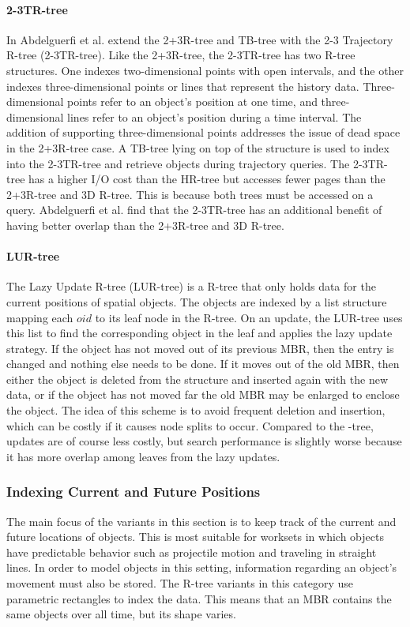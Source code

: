 \paragraph{2-3TR-tree} In \cite{abdelguerfi20022} Abdelguerfi et al. extend 
the 2+3R-tree and TB-tree with the 2-3 Trajectory R-tree (2-3TR-tree). 
Like the 2+3R-tree, the 2-3TR-tree has two R-tree structures. One indexes
two-dimensional points with open intervals, and the other indexes 
three-dimensional points or lines that represent the history data. 
Three-dimensional points refer to an object's position at one time, and 
three-dimensional lines refer to an object's position during a time 
interval. The addition of supporting three-dimensional points addresses 
the issue of dead space in the 2+3R-tree case. A TB-tree lying on top of 
the structure is used to index into the 2-3TR-tree and retrieve objects 
during trajectory queries. The 2-3TR-tree has a higher I/O cost than the 
HR-tree but accesses fewer pages than the 2+3R-tree and 3D R-tree. 
This is because both
trees must be accessed on a query. Abdelguerfi et al. find that the 
2-3TR-tree has an additional benefit of having better overlap than the 
2+3R-tree and 3D R-tree.

\paragraph{LUR-tree} The Lazy Update R-tree (LUR-tree) \cite{kwon2002indexing}
is a R-tree that only holds data for the current positions of spatial 
objects. The objects are indexed by a list structure mapping each $oid$ 
to its leaf node in the R-tree. On an update, the LUR-tree uses this list
to find the corresponding object in the leaf and applies the lazy 
update strategy. If the
object has not moved out of its previous MBR, then the entry is changed
and nothing else needs to be done. If it moves out of the old MBR, then 
either the object is deleted from the structure and inserted again with 
the new data, or if the object has not moved far the old MBR may be 
enlarged to enclose the object. The idea of this scheme is to avoid 
frequent deletion and insertion, which can be costly if it causes node
splits to occur. Compared to the \rstar-tree, updates are of course less
costly, but search performance is slightly worse because it has more 
overlap among leaves from the lazy updates.

\subsubsection{Indexing Current and Future Positions}
The main focus of the variants in this section is to keep track of the current
and future locations of objects. This is most suitable for worksets in which 
objects have predictable behavior such as projectile motion and traveling in
straight lines. In order to model objects in this setting, information regarding
an object's movement must also be stored. The R-tree variants in this category 
use parametric rectangles to index the data. This means that an MBR contains
the same objects over all time, but its shape varies. 

